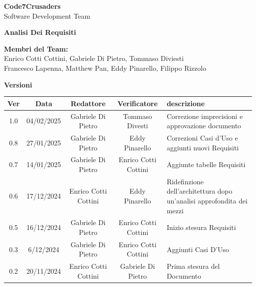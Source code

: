 \documentclass{article}
\begin{document}
\begin{titlepage}
    {\Huge \textbf{Code7Crusaders}}\\
    \vspace{0.5cm}
    {\Large Software Development Team}\\
    \vspace{2cm}
    
    \large \textbf{Analisi Dei Requisiti}
    \vspace{3.9cm}

    \textbf{Membri del Team:}\\
    Enrico Cotti Cottini, Gabriele Di Pietro, Tommaso Diviesti \\
    Francesco Lapenna, Matthew Pan, Eddy Pinarello, Filippo Rizzolo \\
    \vspace{0.5cm}
    
    \vspace{1cm}
\end{titlepage}



\newpage
\begin{center}
    \textbf{Versioni}
    \\
    \vspace{0.3cm}
    \begin{tabular}{|c|c|c|c|>{\centering\arraybackslash}m{}|}
        \hline
        \textbf{Ver} & \textbf{Data} & \textbf{Redattore} & \textbf{Verificatore} & \textbf{descrizione}\\
        \hline
        1.0 & 04/02/2025 & Gabriele Di Pietro & Tommaso Divesti & Correzione imprecisioni e approvazione documento \\
        0.8 & 27/01/2025 & Gabriele Di Pietro & Eddy Pinarello & Correzioni Casi d'Uso e aggiunti nuovi Requisiti \\
        0.7 & 14/01/2025 & Gabriele Di Pietro & Enrico Cotti Cottini & Aggiunte tabelle Requisiti \\
        0.6 & 17/12/2024 & Enrico Cotti Cottini & Eddy Pinarello & Ridefinzione dell'architettura dopo un'analisi approfondita dei mezzi \\
        0.5 & 16/12/2024 & Gabriele Di Pietro & Enrico Cotti Cottini & Inizio stesura Requisiti \\
        0.3 & 6/12/2024 & Gabriele Di Pietro & Enrico Cotti Cottini & Aggiunti Casi D'Uso \\
        0.2 & 20/11/2024 & Enrico Cotti Cottini & Gabriele Di Pietro & Prima stesura del Documento \\
        \hline
    \end{tabular}
\end{center}

\newpage
\tableofcontents
\listoftables
\listoffigures

\newpage



\newpage



\newpage



\newpage


\end{document}
